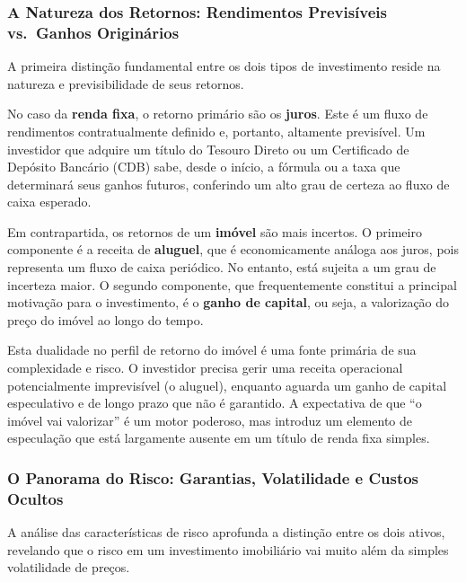 \documentclass[
  a4paper,
]{book}
\begin{document}
\subsubsection{A Natureza dos Retornos: Rendimentos Previsíveis
vs.~Ganhos
Originários}\label{a-natureza-dos-retornos-rendimentos-previsuxedveis-vs.-ganhos-originuxe1rios}

A primeira distinção fundamental entre os dois tipos de investimento
reside na natureza e previsibilidade de seus retornos.

No caso da \textbf{renda fixa}, o retorno primário são os
\textbf{juros}. Este é um fluxo de rendimentos contratualmente definido
e, portanto, altamente previsível. Um investidor que adquire um título
do Tesouro Direto ou um Certificado de Depósito Bancário (CDB) sabe,
desde o início, a fórmula ou a taxa que determinará seus ganhos futuros,
conferindo um alto grau de certeza ao fluxo de caixa esperado.

Em contrapartida, os retornos de um \textbf{imóvel} são mais incertos. O
primeiro componente é a receita de \textbf{aluguel}, que é
economicamente análoga aos juros, pois representa um fluxo de caixa
periódico. No entanto, está sujeita a um grau de incerteza maior. O
segundo componente, que frequentemente constitui a principal motivação
para o investimento, é o \textbf{ganho de capital}, ou seja, a
valorização do preço do imóvel ao longo do tempo.

Esta dualidade no perfil de retorno do imóvel é uma fonte primária de
sua complexidade e risco. O investidor precisa gerir uma receita
operacional potencialmente imprevisível (o aluguel), enquanto aguarda um
ganho de capital especulativo e de longo prazo que não é garantido. A
expectativa de que ``o imóvel vai valorizar'' é um motor poderoso, mas
introduz um elemento de especulação que está largamente ausente em um
título de renda fixa simples.

\subsubsection{O Panorama do Risco: Garantias, Volatilidade e Custos
Ocultos}\label{o-panorama-do-risco-garantias-volatilidade-e-custos-ocultos}

A análise das características de risco aprofunda a distinção entre os
dois ativos, revelando que o risco em um investimento imobiliário vai
muito além da simples volatilidade de preços.
\end{document}
